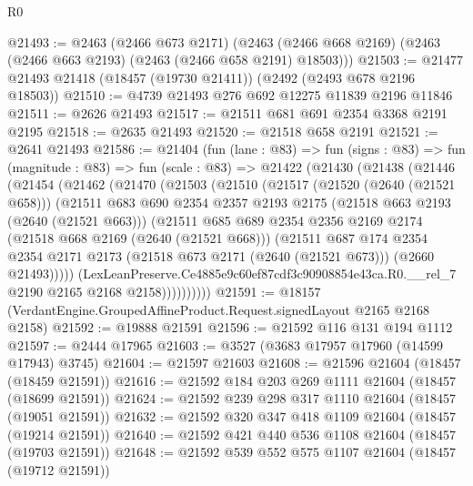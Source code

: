 \begin{lexlean}{R0}
\begin{coremodule}
@21493 := @2463
    (@2466 @673 @2171)
    (@2463 (@2466 @668 @2169) (@2463 (@2466 @663 @2193) (@2463 (@2466 @658 @2191) @18503)))
@21503 := @21477 @21493 @21418 (@18457 (@19730 @21411)) (@2492 (@2493 @678 @2196 @18503))
@21510 := @4739 @21493 @276 @692 @12275 @11839 @2196 @11846
@21511 := @2626 @21493
@21517 := @21511 @681 @691 @2354 @3368 @2191 @2195
@21518 := @2635 @21493
@21520 := @21518 @658 @2191
@21521 := @2641 @21493
@21586 := @21404
    (fun (lane : @83) =>
    fun (signs : @83) =>
    fun (magnitude : @83) =>
    fun (scale : @83) =>
    @21422
      (@21430
        (@21438
          (@21446
            (@21454
              (@21462
                (@21470
                  (@21503
                    (@21510
                      (@21517
                        (@21520 (@2640 (@21521 @658)))
                        (@21511
                          @683
                          @690
                          @2354
                          @2357
                          @2193
                          @2175
                          (@21518 @663 @2193 (@2640 (@21521 @663)))
                          (@21511
                            @685
                            @689
                            @2354
                            @2356
                            @2169
                            @2174
                            (@21518 @668 @2169 (@2640 (@21521 @668)))
                            (@21511
                              @687
                              @174
                              @2354
                              @2354
                              @2171
                              @2173
                              (@21518 @673 @2171 (@2640 (@21521 @673)))
                              (@2660 @21493)))))
                      (LexLeanPreserve.Ce4885e9c60ef87cdf3c90908854e43ca.R0.__rel_7
                        @2190
                        @2165
                        @2168
                        @2158))))))))))
@21591 := @18157 (VerdantEngine.GroupedAffineProduct.Request.signedLayout @2165 @2168 @2158)
@21592 := @19888 @21591
@21596 := @21592 @116 @131 @194 @1112
@21597 := @2444 @17965
@21603 := @3527 (@3683 @17957 @17960 (@14599 @17943) @3745)
@21604 := @21597 @21603
@21608 := @21596 @21604 (@18457 (@18459 @21591))
@21616 := @21592 @184 @203 @269 @1111 @21604 (@18457 (@18699 @21591))
@21624 := @21592 @239 @298 @317 @1110 @21604 (@18457 (@19051 @21591))
@21632 := @21592 @320 @347 @418 @1109 @21604 (@18457 (@19214 @21591))
@21640 := @21592 @421 @440 @536 @1108 @21604 (@18457 (@19703 @21591))
@21648 := @21592 @539 @552 @575 @1107 @21604 (@18457 (@19712 @21591))

\end{coremodule}
\end{lexlean}
